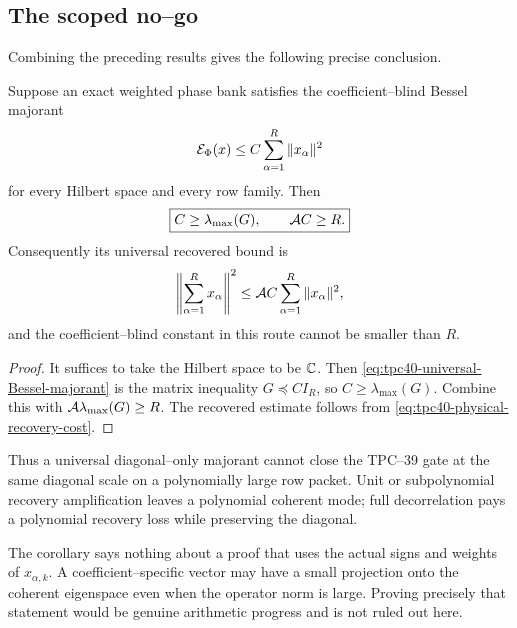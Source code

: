 \subsection{The scoped no--go}

Combining the preceding results gives the following precise conclusion.

\begin{corollary}
\label{cor:tpc40-physical-no-go}
Suppose an exact weighted phase bank satisfies the coefficient--blind
Bessel majorant
\begin{equation}
 \mathcal E_{\Phi}(x)
 \le C\sum_{\alpha=1}^{R}\|x_\alpha\|^2
 \label{eq:tpc40-universal-Bessel-majorant}
\end{equation}
for every Hilbert space and every row family.  Then
\begin{equation}
 \boxed{
 C\ge\lambda_{\max}(G),
 \qquad
 \mathcal A C\ge R.}
 \label{eq:tpc40-universal-Bessel-cost}
\end{equation}
Consequently its universal recovered bound is
\begin{equation}
 \left\|\sum_{\alpha=1}^{R}x_\alpha\right\|^2
 \le\mathcal A C\sum_{\alpha=1}^{R}\|x_\alpha\|^2,
 \label{eq:tpc40-universal-recovered-Bessel}
\end{equation}
and the coefficient--blind constant in this route cannot be smaller than
\(R\).
\end{corollary}

\begin{proof}
It suffices to take the Hilbert space to be \(\mathbb C\).  Then
\eqref{eq:tpc40-universal-Bessel-majorant} is the matrix inequality
\(G\preceq CI_R\), so \(C\ge\lambda_{\max}(G)\).  Combine this with
\(\mathcal A\lambda_{\max}(G)\ge R\).  The recovered estimate follows from
\eqref{eq:tpc40-physical-recovery-cost}.
\end{proof}

Thus a universal diagonal--only majorant cannot close the TPC--39 gate at
the same diagonal scale on a polynomially large row packet.  Unit or
subpolynomial recovery amplification leaves a polynomial coherent mode;
full decorrelation pays a polynomial recovery loss while preserving the
diagonal.

The corollary says nothing about a proof that uses the actual signs and
weights of \(x_{\alpha,k}\).  A coefficient--specific vector may have a
small projection onto the coherent eigenspace even when the operator norm
is large.  Proving precisely that statement would be genuine arithmetic
progress and is not ruled out here.
